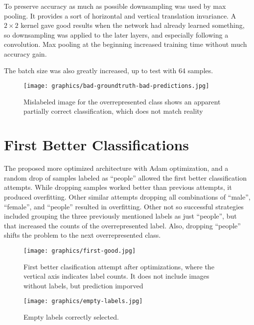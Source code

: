 \documentclass{article}
\begin{document}
To preserve accuracy as much as possible downsampling was used by max pooling. 
It provides a sort of horizontal and vertical translation invariance.
A \(2 \times 2\) kernel gave good results when the network had already learned something, so downsampling was applied to the later layers, and especially following a convolution.
Max pooling at the beginning increased training time without much accuracy gain.

The batch size was also greatly increased, up to test with 64 samples.

\begin{figure}[ht]
  \centering
  \texttt{[image: graphics/bad-groundtruth-bad-predictions.jpg]}
  \caption{Mislabeled image for the overrepresented class shows an apparent partially correct classification, which does not match reality}
\end{figure}

\section{First Better Classifications}
The proposed more optimized architecture with Adam optimization, and a random drop of samples labeled as ``people'' allowed the first better classification attempts.
While dropping samples worked better than previous attempts, it produced overfitting.
Other similar attempts dropping all combinations of ``male'', ``female'', and ``people'' resulted in overfitting.
Other not so successful strategies included grouping the three previously mentioned labels as just ``people'', but that increased the counts of the overrepresented label.
Also, dropping ``people'' shifts the problem to the next overrepresented class.


\begin{figure}[ht]
  \centering
  \texttt{[image: graphics/first-good.jpg]}
  \caption{First better clasification attempt after optimizations, where the vertical axis indicates label counts.
      It does not include images without labels, but prediction imporved
	}
\end{figure}

\begin{figure}[ht]
  \centering
  \texttt{[image: graphics/empty-labels.jpg]}
  \caption{Empty labels correctly selected.}
\end{figure}
\end{document}
